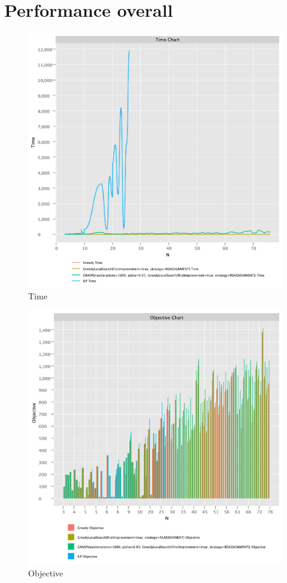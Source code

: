 \documentclass{article}
\begin{document}
\newpage

\section{Performance overall}

\begin{figure}[!h]
    \centering
    \includegraphics[width=1\textwidth]{./documentation/assets/all.timeChart.pdf}
    \caption{Time}
    \label{fig:all_time}
\end{figure}\FloatBarrier

\begin{figure}
    \centering
    \includegraphics[width=1\textwidth]{./documentation/assets/all.objectiveChart.pdf}
    \caption{Objective}
    \label{fig:all_time}
\end{figure}\FloatBarrier
\end{document}
